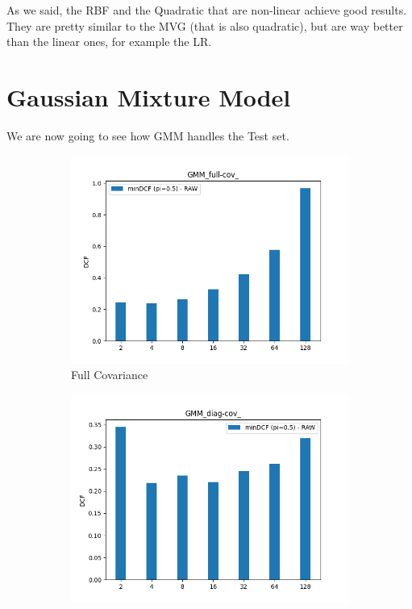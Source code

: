 \documentclass[english]{report}
\begin{document}
As we said, the RBF and the Quadratic that are non-linear achieve good results.
They are pretty similar to the MVG (that is also quadratic), but are way better than the linear ones, for example the LR.

\newpage

\section{Gaussian Mixture Model}
We are now going to see how GMM handles the Test set.

\begin{figure}[h!]
    \begin{subfigure}{0.4\textwidth}
        \includegraphics[scale=0.4]{../../images/evaluation/GMM_full-cov_component_comparison}
        \caption{Full Covariance}
    \end{subfigure}
    \begin{subfigure}{0.4\textwidth}
        \includegraphics[scale=0.4]{../../images/evaluation/GMM_diag-cov_component_comparison}

\end{subfigure}
\end{figure}
\end{document}
